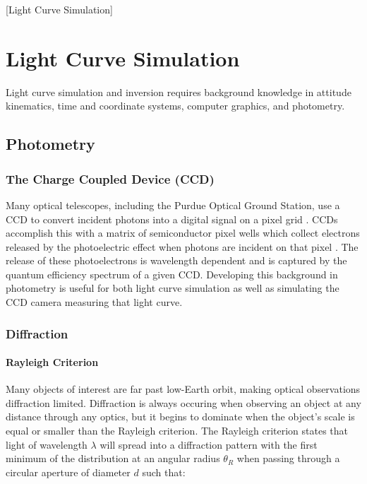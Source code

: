 [Light Curve Simulation]

\chapter{Light Curve Simulation}

Light curve simulation and inversion requires background knowledge in attitude kinematics, time and coordinate systems, computer graphics, and photometry.

\section{Photometry}

\subsection{The Charge Coupled Device (CCD)}

Many optical telescopes, including the Purdue Optical Ground Station, use a CCD to convert incident photons into a digital signal on a pixel grid \cite{krag2003}. CCDs accomplish this with a matrix of semiconductor pixel wells which collect electrons released by the photoelectric effect when photons are incident on that pixel \cite{krag2003}. The release of these photoelectrons is wavelength dependent and is captured by the quantum efficiency spectrum of a given CCD. Developing this background in photometry is useful for both light curve simulation as well as simulating the CCD camera measuring that light curve. 

\subsection{Diffraction}

\subsubsection{Rayleigh Criterion}

Many objects of interest are far past low-Earth orbit, making optical observations diffraction limited. Diffraction is always occuring when observing an object at any distance through any optics, but it begins to dominate when the object's scale is equal or smaller than the Rayleigh criterion. The Rayleigh criterion states that light of wavelength $\lambda$ will spread into a diffraction pattern with the first minimum of the distribution at an angular radius $\theta_R$ when passing through a circular aperture of diameter $d$ such that:

